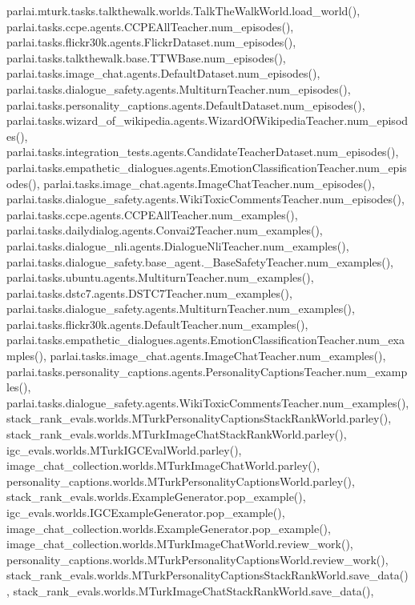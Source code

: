 parlai.\+mturk.\+tasks.\+talkthewalk.\+worlds.\+Talk\+The\+Walk\+World.\+load\+\_\+world(), parlai.\+tasks.\+ccpe.\+agents.\+C\+C\+P\+E\+All\+Teacher.\+num\+\_\+episodes(), parlai.\+tasks.\+flickr30k.\+agents.\+Flickr\+Dataset.\+num\+\_\+episodes(), parlai.\+tasks.\+talkthewalk.\+base.\+T\+T\+W\+Base.\+num\+\_\+episodes(), parlai.\+tasks.\+image\+\_\+chat.\+agents.\+Default\+Dataset.\+num\+\_\+episodes(), parlai.\+tasks.\+dialogue\+\_\+safety.\+agents.\+Multiturn\+Teacher.\+num\+\_\+episodes(), parlai.\+tasks.\+personality\+\_\+captions.\+agents.\+Default\+Dataset.\+num\+\_\+episodes(), parlai.\+tasks.\+wizard\+\_\+of\+\_\+wikipedia.\+agents.\+Wizard\+Of\+Wikipedia\+Teacher.\+num\+\_\+episodes(), parlai.\+tasks.\+integration\+\_\+tests.\+agents.\+Candidate\+Teacher\+Dataset.\+num\+\_\+episodes(), parlai.\+tasks.\+empathetic\+\_\+dialogues.\+agents.\+Emotion\+Classification\+Teacher.\+num\+\_\+episodes(), parlai.\+tasks.\+image\+\_\+chat.\+agents.\+Image\+Chat\+Teacher.\+num\+\_\+episodes(), parlai.\+tasks.\+dialogue\+\_\+safety.\+agents.\+Wiki\+Toxic\+Comments\+Teacher.\+num\+\_\+episodes(), parlai.\+tasks.\+ccpe.\+agents.\+C\+C\+P\+E\+All\+Teacher.\+num\+\_\+examples(), parlai.\+tasks.\+dailydialog.\+agents.\+Convai2\+Teacher.\+num\+\_\+examples(), parlai.\+tasks.\+dialogue\+\_\+nli.\+agents.\+Dialogue\+Nli\+Teacher.\+num\+\_\+examples(), parlai.\+tasks.\+dialogue\+\_\+safety.\+base\+\_\+agent.\+\_\+\+Base\+Safety\+Teacher.\+num\+\_\+examples(), parlai.\+tasks.\+ubuntu.\+agents.\+Multiturn\+Teacher.\+num\+\_\+examples(), parlai.\+tasks.\+dstc7.\+agents.\+D\+S\+T\+C7\+Teacher.\+num\+\_\+examples(), parlai.\+tasks.\+dialogue\+\_\+safety.\+agents.\+Multiturn\+Teacher.\+num\+\_\+examples(), parlai.\+tasks.\+flickr30k.\+agents.\+Default\+Teacher.\+num\+\_\+examples(), parlai.\+tasks.\+empathetic\+\_\+dialogues.\+agents.\+Emotion\+Classification\+Teacher.\+num\+\_\+examples(), parlai.\+tasks.\+image\+\_\+chat.\+agents.\+Image\+Chat\+Teacher.\+num\+\_\+examples(), parlai.\+tasks.\+personality\+\_\+captions.\+agents.\+Personality\+Captions\+Teacher.\+num\+\_\+examples(), parlai.\+tasks.\+dialogue\+\_\+safety.\+agents.\+Wiki\+Toxic\+Comments\+Teacher.\+num\+\_\+examples(), stack\+\_\+rank\+\_\+evals.\+worlds.\+M\+Turk\+Personality\+Captions\+Stack\+Rank\+World.\+parley(), stack\+\_\+rank\+\_\+evals.\+worlds.\+M\+Turk\+Image\+Chat\+Stack\+Rank\+World.\+parley(), igc\+\_\+evals.\+worlds.\+M\+Turk\+I\+G\+C\+Eval\+World.\+parley(), image\+\_\+chat\+\_\+collection.\+worlds.\+M\+Turk\+Image\+Chat\+World.\+parley(), personality\+\_\+captions.\+worlds.\+M\+Turk\+Personality\+Captions\+World.\+parley(), stack\+\_\+rank\+\_\+evals.\+worlds.\+Example\+Generator.\+pop\+\_\+example(), igc\+\_\+evals.\+worlds.\+I\+G\+C\+Example\+Generator.\+pop\+\_\+example(), image\+\_\+chat\+\_\+collection.\+worlds.\+Example\+Generator.\+pop\+\_\+example(), image\+\_\+chat\+\_\+collection.\+worlds.\+M\+Turk\+Image\+Chat\+World.\+review\+\_\+work(), personality\+\_\+captions.\+worlds.\+M\+Turk\+Personality\+Captions\+World.\+review\+\_\+work(), stack\+\_\+rank\+\_\+evals.\+worlds.\+M\+Turk\+Personality\+Captions\+Stack\+Rank\+World.\+save\+\_\+data(), stack\+\_\+rank\+\_\+evals.\+worlds.\+M\+Turk\+Image\+Chat\+Stack\+Rank\+World.\+save\+\_\+data(), 